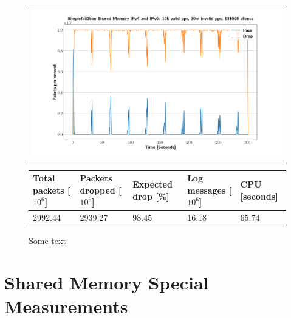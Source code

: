 \begin{figure}[p]
	\label{fig:simplefail2ban:shm:ip46:10m}
	\centering
	\scriptsize
	\begin{tabular}{c}
    	\centerline{\includegraphics[width=1.2\textwidth]{images/simplefail2ban_shm_ipv46_v10k_iv10m_c131068.png}}
	\end{tabular}
	\begin{tabular}{lllll}
		\toprule
		\textbf{Total packets [$10^6$]} & \textbf{Packets dropped [$10^6$]} & \textbf{Expected drop [\%]} & \textbf{Log messages [$10^6$]} & \textbf{CPU [seconds]} \\ \midrule 
		2992.44 & 2939.27 & 98.45 & 16.18 & 65.74 \\
		\bottomrule
	\end{tabular}
	\caption[Simplefail2ban Shared Memory IPv4 \& IPv6 10m PPS]{Some text}
\end{figure}

\section{Shared Memory Special Measurements}

